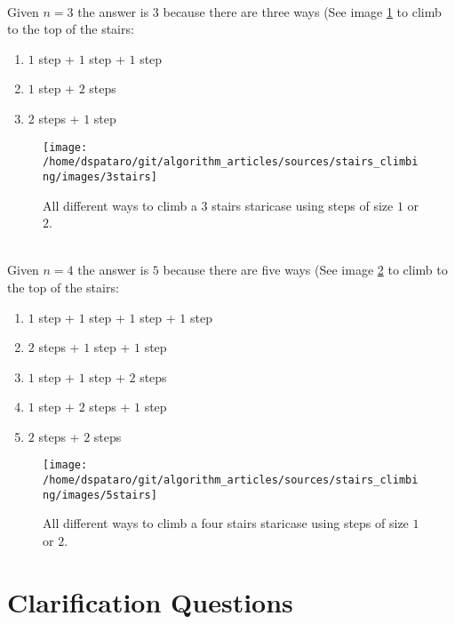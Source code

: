 \begin{example}
	\hfill \\ 
	Given $n = 3$ the answer is $3$ because there are three ways (See image \ref{fig:stair_example_3} to climb to the top of the stairs:
	\begin{enumerate}
		\item $1$ step + $1$ step + $1$ step
		\item $1$ step + $2$ steps
		\item $2$ steps + $1$ step
	\end{enumerate}

\begin{figure}
	\label{fig:stair_example_3}
	\centering
	\texttt{[image: /home/dspataro/git/algorithm\_articles/sources/stairs\_climbing/images/3stairs]}
	\caption{All different ways to climb a 3 stairs staricase using steps of size $1$ or $2$.}
\end{figure}

\end{example}

\begin{example}
	\hfill \\
	Given $n = 4$ the answer is $5$ because there are five ways (See image \ref{fig:stair_example_5} to climb to the top of the stairs:
	\begin{enumerate}
		\item $1$ step + $1$ step + $1$ step + $1$ step
		\item $2$ steps + $1$ step + $1$ step
		\item $1$ step + $1$ step + $2$ steps 
		\item $1$ step + $2$ steps + $1$ step
		\item $2$ steps +  $2$ steps
	\end{enumerate}

\begin{figure}
	\label{fig:stair_example_5}
	\centering
	\texttt{[image: /home/dspataro/git/algorithm\_articles/sources/stairs\_climbing/images/5stairs]}
	\caption{All different ways to climb a four stairs staricase using steps of size $1$ or $2$.}
\end{figure}

\end{example}
	

\section{Clarification Questions}

